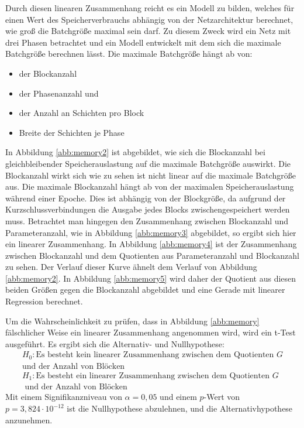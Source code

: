 Durch diesen linearen Zusammenhang reicht es ein Modell zu bilden, welches für einen Wert des Speicherverbrauchs abhängig von der Netzarchitektur berechnet, wie groß die Batchgröße maximal sein darf. Zu diesem Zweck wird ein Netz mit drei Phasen betrachtet und ein Modell entwickelt mit dem sich die maximale Batchgröße berechnen lässt. Die maximale Batchgröße hängt ab von:

\begin{itemize}
 \item der Blockanzahl
 \item der Phasenanzahl und
 \item der Anzahl an Schichten pro Block
 \item Breite der Schichten je Phase
\end{itemize}
In Abbildung \ref{abb:memory2} ist abgebildet, wie sich die Blockanzahl bei gleichbleibender Speicherauslastung auf die maximale Batchgröße auswirkt. Die Blockanzahl wirkt sich wie zu sehen ist nicht linear auf die maximale Batchgröße aus. Die maximale Blockanzahl hängt ab von der maximalen Speicherauslastung während einer Epoche. Dies ist abhängig von der Blockgröße, da aufgrund der Kurzschlussverbindungen die Ausgabe jedes Blocks zwischengespeichert werden muss.
Betrachtet man hingegen den Zusammenhang zwischen Blockanzahl und Parameteranzahl, wie in Abbildung \ref{abb:memory3} abgebildet, so ergibt sich hier ein linearer Zusammenhang. In Abbildung \ref{abb:memory4} ist der Zusammenhang zwischen Blockanzahl und dem Quotienten aus Parameteranzahl und Blockanzahl zu sehen. Der Verlauf dieser Kurve ähnelt dem Verlauf von Abbildung \ref{abb:memory2}. In Abbildung \ref{abb:memory5} wird daher der Quotient aus diesen beiden Größen gegen die Blockanzahl abgebildet und eine Gerade mit linearer Regression berechnet.


Um die Wahrscheinlichkeit zu prüfen, dass in Abbildung \ref{abb:memory} fälschlicher Weise ein linearer Zusammenhang angenommen wird, wird ein t-Test ausgeführt.
Es ergibt sich die Alternativ- und Nullhypothese:
\begin{align*}
 H_0: \text{Es besteht kein linearer Zusammenhang zwischen dem Quotienten } G \\
 \text{und der Anzahl von Blöcken} \\
 H_1: \text{Es besteht ein linearer Zusammenhang zwischen dem Quotienten } G \\ 
 \text{ und der Anzahl von Blöcken}
\end{align*}
Mit einem Signifikanzniveau von $\alpha =0,05$ und einem $p$-Wert von $p=3,824 \cdot 10^{-12}$ ist die Nullhypothese abzulehnen, und die Alternativhypothese anzunehmen. 

